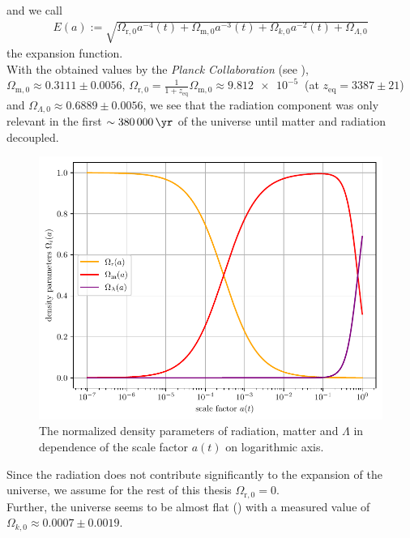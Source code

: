 and we call 
\begin{align}
    E(a) := \sqrt{\Omega_{\text{r},0} a^{-4}(t) + \Omega_{\text{m},0} a^{-3}(t) + \Omega_{k,0} a^{-2}(t) + \Omega_{\Lambda,0}} \label{eq:expansion-function} 
\end{align}
the expansion function. \\

\noindent With the obtained values by the \textit{Planck Collaboration} (see \cite[Table 7]{Planck2020}), $\Omega_{\text{m},0} \approx 0.3111 \pm 0.0056$, $\Omega_{\text{r},0} = \frac{1}{1 + z_{\text{eq}}} \Omega_{\text{m},0} \approx \SI{9.812e-5}{}$ (at $z_{\text{eq}} = 3387 \pm 21$) and $\Omega_{\Lambda,0} \approx 0.6889 \pm 0.0056$, we see that the radiation component was only relevant in the first $\sim \SI{380000}{\yr}$ of the universe until matter and radiation decoupled.

\begin{figure}[H]
    \centering
    \includegraphics[scale=1.0]{figures/plots/PDF/density-parameters_vs_scale-factor.pdf}
    \caption{The normalized density parameters of radiation, matter and $\Lambda$ in dependence of the scale factor $a(t)$ on logarithmic axis.}
    \label{fig:density-parameters-vs-scale-factor}
\end{figure}

\noindent Since the radiation does not contribute significantly to the expansion of the universe, we assume for the rest of this thesis $\Omega_{\text{r},0} = 0$. \\
Further, the universe seems to be almost flat (\cite[Table 7]{Planck2020}) with a measured value of $\Omega_{k,0} \approx 0.0007 \pm 0.0019$. 

